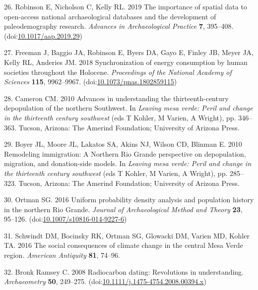 \documentclass[
]{sa}
\newenvironment{cslreferences}%
  {}%
  {\par}
\begin{document}
\begin{cslreferences}
\leavevmode\hypertarget{ref-Robinson2019}{}%
26. Robinson E, Nicholson C, Kelly RL. 2019 The importance of spatial data to open-access national archaeological databases and the development of paleodemography research. \emph{Advances in Archaeological Practice} \textbf{7}, 395--408. (doi:\href{https://doi.org/10.1017/aap.2019.29}{10.1017/aap.2019.29})

\leavevmode\hypertarget{ref-Freeman2018PNAS}{}%
27. Freeman J, Baggio JA, Robinson E, Byers DA, Gayo E, Finley JB, Meyer JA, Kelly RL, Anderies JM. 2018 Synchronization of energy consumption by human societies throughout the Holocene. \emph{Proceedings of the National Academy of Sciences} \textbf{115}, 9962--9967. (doi:\href{https://doi.org/10.1073/pnas.1802859115}{10.1073/pnas.1802859115})

\leavevmode\hypertarget{ref-Cameron2010}{}%
28. Cameron CM. 2010 Advances in understanding the thirteenth-century depopulation of the northern Southwest. In \emph{Leaving mesa verde: Peril and change in the thirteenth century southwest} (eds T Kohler, M Varien, A Wright), pp. 346--363. Tucson, Arizona: The Amerind Foundation; University of Arizona Press.

\leavevmode\hypertarget{ref-Boyer2010}{}%
29. Boyer JL, Moore JL, Lakatos SA, Akins NJ, Wilson CD, Blinman E. 2010 Remodeling immigration: A Northern Rio Grande perspective on depopulation, migration, and donation-side models. In \emph{Leaving mesa verde: Peril and change in the thirteenth century southwest} (eds T Kohler, M Varien, A Wright), pp. 285--323. Tucson, Arizona: The Amerind Foundation; University of Arizona Press.

\leavevmode\hypertarget{ref-Ortman2016}{}%
30. Ortman SG. 2016 Uniform probability density analysis and population history in the northern Rio Grande. \emph{Journal of Archaeological Method and Theory} \textbf{23}, 95--126. (doi:\href{https://doi.org/10.1007/s10816-014-9227-6}{10.1007/s10816-014-9227-6})

\leavevmode\hypertarget{ref-Schwindt2016}{}%
31. Schwindt DM, Bocinsky RK, Ortman SG, Glowacki DM, Varien MD, Kohler TA. 2016 The social consequences of climate change in the central Mesa Verde region. \emph{American Antiquity} \textbf{81}, 74--96.

\leavevmode\hypertarget{ref-Bronk2008}{}%
32. Bronk Ramsey C. 2008 Radiocarbon dating: Revolutions in understanding. \emph{Archaeometry} \textbf{50}, 249--275. (doi:\href{https://doi.org/10.1111/j.1475-4754.2008.00394.x}{10.1111/j.1475-4754.2008.00394.x})


\end{cslreferences}
\end{document}
